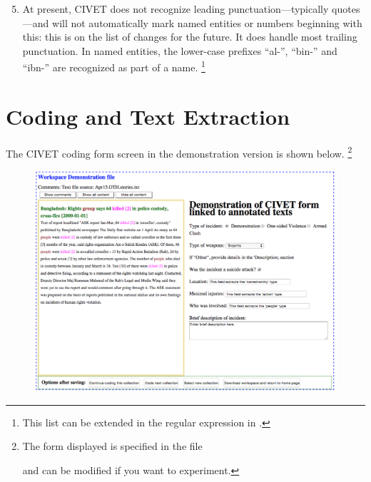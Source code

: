 \documentclass[letterpaper,10pt,english]{sphinxmanual}
\begin{document}
\begin{enumerate}
\setcounter{enumi}{4}
\item {} 
At present, CIVET does not recognize leading punctuation—typically
quotes—and will not automatically mark named entities or numbers
beginning with this: this is on the list of changes for the future.
It does handle most trailing punctuation. In named entities, the
lower-case prefixes “al-”, “bin-” and “ibn-” are recognized as
part of a name. \footnote{
This list can be extended in the regular expression  in
.
}

\end{enumerate}


\chapter{Coding and Text Extraction}
\label{extraction::doc}\label{extraction:coding-and-text-extraction}
The CIVET coding form screen in the demonstration version is shown below. \footnote{
The form displayed is specified in the file


and can be modified if you want to experiment.
}
\begin{figure}[htbp]
\centering

\includegraphics[width=0.800\linewidth]{civetcoder.png}
\end{figure}
\end{document}
